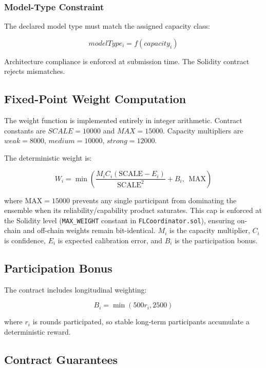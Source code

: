 \documentclass[conference]{IEEEtran}
\begin{document}
\subsubsection{Model-Type Constraint}

The declared model type must match the assigned capacity class:

\begin{equation}
modelType_i = f(capacity_i)
\end{equation}

Architecture compliance is enforced at submission time. The Solidity contract rejects mismatches.

\subsection{Fixed-Point Weight Computation}

The weight function is implemented entirely in integer arithmetic. Contract constants are $SCALE = 10000$ and $MAX = 15000$. Capacity multipliers are $weak = 8000$, $medium = 10000$, $strong = 12000$.

The deterministic weight is:

\begin{equation}
W_i = \min\left(\frac{M_i C_i (\text{SCALE}-E_i)}{\text{SCALE}^2} + B_i,\ \ \text{MAX}\right)
\end{equation}

where $\text{MAX}=15000$ prevents any single participant from dominating the ensemble when its reliability/capability product saturates. This cap is enforced at the Solidity level (\texttt{MAX\_WEIGHT} constant in \texttt{FLCoordinator.sol}), ensuring on-chain and off-chain weights remain bit-identical. $M_i$ is the capacity multiplier, $C_i$ is confidence, $E_i$ is expected calibration error, and $B_i$ is the participation bonus.

\subsection{Participation Bonus}

The contract includes longitudinal weighting:

\begin{equation}
B_i = \min(500r_i,2500)
\end{equation}

where $r_i$ is rounds participated, so stable long-term participants accumulate a deterministic reward.

\subsection{Contract Guarantees}
\end{document}
